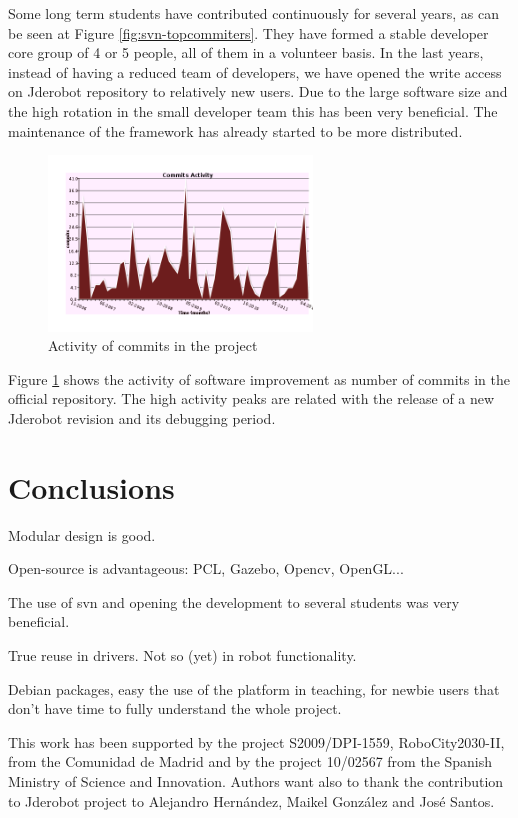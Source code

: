\documentclass[twocolumn]{svjour3}          %
\begin{document}
Some long term students have contributed continuously for several years, as can be seen at Figure \ref{fig:svn-topcommiters}. They have formed a stable developer core group of 4 or 5 people, all of them in a volunteer basis. In the last years, instead of having a reduced team of developers, we have opened the write access on Jderobot repository to relatively new users. Due to the large software size and the high rotation in the small developer team this has been very beneficial. The maintenance of the framework has already started to be more distributed.

\begin{figure}
  \includegraphics[width=7cm]{figs/svn_activity.png}
\caption{Activity of commits in the project}
\label{fig:svn-activity}
\end{figure}

Figure \ref{fig:svn-activity} shows the activity of software improvement as number of commits in the official repository. The high activity peaks are related with the release of a new Jderobot revision and its debugging period.

\section{Conclusions}

Modular design is good.

Open-source is advantageous: PCL, Gazebo, Opencv, OpenGL...

The use of svn and opening the development to several students was very beneficial.

True reuse in drivers. Not so (yet) in robot functionality.

Debian packages, easy the use of the platform in teaching, for newbie users that don't have time to fully understand the whole project.


\begin{acknowledgements}
This work has been supported by the project S2009/DPI-1559, RoboCity2030-II, from the Comunidad de Madrid and by the project 10/02567 from the Spanish Ministry of Science and Innovation. Authors want also to thank the contribution to Jderobot project to Alejandro Hernández, Maikel González and José Santos.
\end{acknowledgements}

\end{document}
